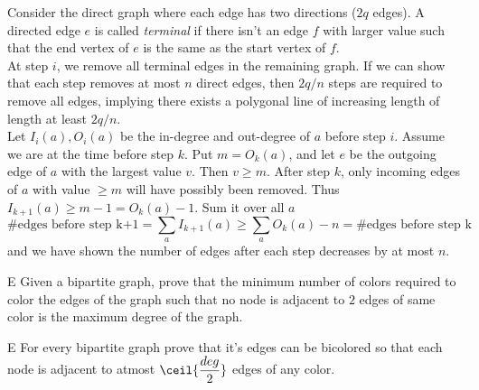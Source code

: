\begin{solution}[ninjaturtle]
    Consider the direct graph where each edge has two directions ($2q$
    edges). A directed edge $e$ is called \emph{terminal} if there isn't an edge $f$
    with larger value such that the end vertex of $e$ is the same as the start
    vertex of $f$.\\

    At step $i$, we remove all terminal edges in the remaining
    graph. If we can show that each step removes at most $n$ direct edges,
    then $2q/n$ steps are required to remove all edges, implying there exists
    a polygonal line of increasing length of length at least $2q/n$.\\

    Let $I_i(a), O_i(a)$ be the in-degree and out-degree of $a$ before step
    $i$. Assume we are at the time before step $k$. Put $m = O_k(a)$, and let
    $e$ be the outgoing edge of $a$ with the largest value $v$. Then $v \geq
    m$. After step $k$, only incoming edges of $a$ with value $ \geq m$ will
    have possibly been removed. Thus $I_{k+1}(a) \geq m-1 = O_k(a)-1$. Sum it
    over all $a$
    \[\#\text{edges before step k+1} = \sum_a I_{k+1}(a) \geq \sum_a O_k(a) -n
    = \#\text{edges before step k}\] 
    and we have shown the number of edges
    after each step decreases by at most $n$.
\end{solution}



\prob{}
{}{E}{
    Given a bipartite graph, prove that the minimum number of colors required
    to color the edges of the graph such that no node is adjacent to $ 2 $
    edges of same color is the maximum degree of the graph.
}\label{problem:bipartite_graph_3}


\prob{}
{}{E}{
    For every bipartite graph prove that it's edges can be bicolored so that each
    node is adjacent to atmost $ \ceil{\dfrac{deg}{2}} $ edges of  any color.
}\label{problem:bipartite_graph_4}







